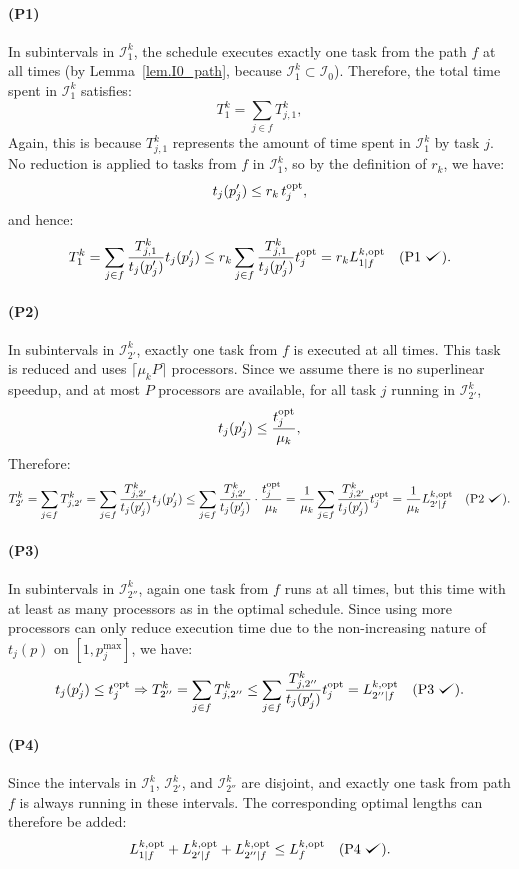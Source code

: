 \documentclass{article}
\def\checkmark{\tikz\fill[scale=0.4](0,.35) -- (.25,0) -- (1,.7) -- (.25,.15) -- cycle;}
\newcommand\rratio{r\xspace}
\newcommand\opt{\textnormal{opt}\xspace}
\begin{document}
\paragraph{(P1)} In subintervals in $\mathcal{I}_1^k$, the schedule executes exactly one task from the path $f$ at all times (by Lemma~\ref{lem.I0_path}, because $\mathcal{I}_1^k \subset \mathcal{I}_0$). Therefore, the total time spent in $\mathcal{I}_1^k$ satisfies:
\[
T_1^k = \sum_{j \in f} T_{j,1}^k,
\]
Again, this is because $T_{j,1}^k$ represents the amount of time spent in $\mathcal{I}_1^k$ by task $j$. No reduction is applied to tasks from $f$ in $\mathcal{I}_1^k$, so by the definition of $\rratio_k$, we have:
\[
t_j(p'_j) \le \rratio_k\, t_j^{\opt},
\]
and hence:
\[
T_1^k = \sum_{j \in f} \frac{T_{j,1}^k}{t_j(p'_j)} t_j(p'_j) \le \rratio_k \sum_{j \in f} \frac{T_{j,1}^k}{t_j(p'_j)} t_j^{\opt} = \rratio_k L_{1|f}^{k,\opt} \quad \text{(P1 \checkmark)}.
\]

\paragraph{(P2)} In subintervals in $\mathcal{I}_{2'}^k$, exactly one task from $f$ is executed at all times. This task is reduced and uses $\lceil \mu_k P\rceil$ processors. Since we assume there is no superlinear speedup, and at most $P$ processors are available, for all task $j$ running in $\mathcal{I}_{2'}^k$, 
\[
t_j(p'_j) \le \frac{t_j^{\opt}}{\mu_k},
\]
Therefore:
\[
T_{2'}^k = \sum_{j \in f} T_{j,2'}^k = \sum_{j \in f} \frac{T_{j,2'}^k}{t_j(p'_j)} t_j(p'_j) \le \sum_{j \in f} \frac{T_{j,2'}^k}{t_j(p'_j)} \cdot \frac{t_j^{\opt}}{\mu_k} = \frac{1}{\mu_k} \sum_{j \in f} \frac{T_{j,2'}^k}{t_j(p'_j)} t_j^{\opt} = \frac{1}{\mu_k} L_{2'|f}^{k,\opt} \quad \text{(P2 \checkmark)}.
\]

\paragraph{(P3)} In subintervals in $\mathcal{I}_{2''}^k$, again one task from $f$ runs at all times, but this time with at least as many processors as in the optimal schedule. Since using more processors can only reduce execution time due to the non-increasing nature of $t_j(p)$ on $[1,p^{\max}_j]$, we have:
\[
t_j(p'_j) \le t_j^{\opt} \Rightarrow T_{2''}^k = \sum_{j \in f} T_{j,2''}^k \le \sum_{j \in f} \frac{T_{j,2''}^k}{t_j(p'_j)} t_j^{\opt} = L_{2''|f}^{k,\opt} \quad \text{(P3 \checkmark)}.
\]

\paragraph{(P4)} Since the intervals in $\mathcal{I}_{1}^k$, $\mathcal{I}_{2'}^k$, and $\mathcal{I}_{2''}^k$ are disjoint, and exactly one task from path $f$ is always running in these intervals. The corresponding optimal lengths can therefore be added:
\[
L_{1|f}^{k,\opt} + L_{2'|f}^{k,\opt} + L_{2''|f}^{k,\opt} \le L_f^{k,\opt} \quad \text{(P4 \checkmark)}.
\]
\end{document}
